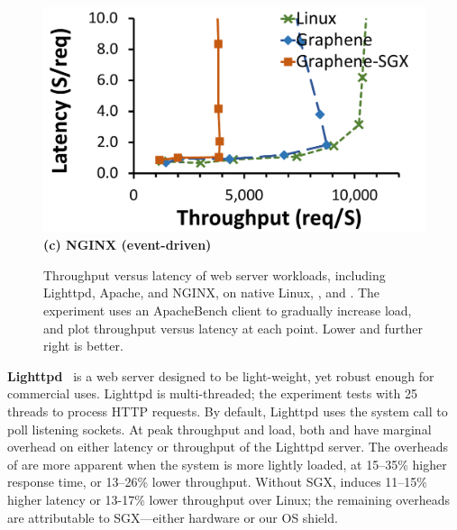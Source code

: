 \begin{figure}[t!]
\begin{minipage}{.45\textwidth}
\centering
\footnotesize
\vspace{6pt}
\includegraphics[width=\linewidth]{sgx/nginx-throughput-latency}\\
\vspace{3pt}
{\bf (c) NGINX (event-driven)}
\vspace{6pt}
\end{minipage}

\caption{Throughput versus latency of web server workloads, including Lighttpd, Apache, and NGINX, on native Linux, \graphene{}, and \graphenesgx{}.
The experiment uses an ApacheBench client to gradually increase load, and plot
throughput versus latency at each point.  Lower and further right
is better.
}
\label{fig:server-throughput-latency}
\end{figure}



{\bf Lighttpd}~\cite{lighttpd} is a web server designed to be light-weight, yet robust enough for commercial uses. 
Lighttpd is multi-threaded; the experiment tests with 25 threads to process HTTP requests. 
By default, Lighttpd uses the  system call to poll listening sockets.
At peak throughput and load,  both \graphene{} and \graphenesgx{} have marginal overhead on either latency or throughput of the Lighttpd server.
The overheads of \graphene{} are more apparent when the system
is more lightly loaded, at 
15--35\% higher response time, or 13--26\% lower throughput. 
Without SGX, \graphene{} induces 
11--15\% higher latency or 13-17\% lower throughput over Linux;
the remaining overheads are attributable to SGX---either hardware or our OS shield.

